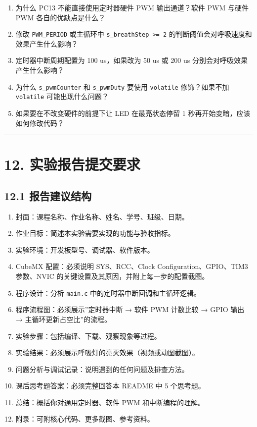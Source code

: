 \documentclass[
  chinese,
  UTF8,
  oneside,
  openany]{ctexbook}
\providecommand{\tightlist}{%
  \setlength{\itemsep}{0pt}\setlength{\parskip}{0pt}}
\begin{document}
\begin{enumerate}
\def\labelenumi{\arabic{enumi}.}
\tightlist
\item
  为什么 PC13 不能直接使用定时器硬件 PWM 输出通道？软件 PWM 与硬件 PWM
  各自的优缺点是什么？
\item
  修改 \texttt{PWM\_PERIOD} 或主循环中
  \texttt{s\_breathStep\ \textgreater{}=\ 2}
  的判断阈值会对呼吸速度和效果产生什么影响？
\item
  定时器中断周期配置为 100 us，如果改为 50 us 或 200 us
  分别会对呼吸效果产生什么影响？
\item
  为什么 \texttt{s\_pwmCounter} 和 \texttt{s\_pwmDuty} 要使用
  \texttt{volatile} 修饰？如果不加 \texttt{volatile} 可能出现什么问题？
\item
  如果要在不改变硬件的前提下让 LED 在最亮状态停留 1
  秒再开始变暗，应该如何修改代码？
\end{enumerate}

\begin{center}\rule{0.5\linewidth}{0.5pt}\end{center}

\section{12.
实验报告提交要求}\label{ux5b9eux9a8cux62a5ux544aux63d0ux4ea4ux8981ux6c42-3}

\subsection{12.1
报告建议结构}\label{ux62a5ux544aux5efaux8baeux7ed3ux6784-6}

\begin{enumerate}
\def\labelenumi{\arabic{enumi}.}
\tightlist
\item
  封面：课程名称、作业名称、姓名、学号、班级、日期。
\item
  作业目标：简述本实验需要实现的功能与验收指标。
\item
  实验环境：开发板型号、调试器、软件版本。
\item
  CubeMX 配置：必须说明 SYS、RCC、Clock Configuration、GPIO、TIM3
  参数、NVIC 的关键设置及其原因，并附上每一步的配置截图。
\item
  程序设计：分析 \texttt{main.c} 中的定时器中断回调和主循环逻辑。
\item
  程序流程图：必须展示''定时器中断 → 软件 PWM 计数比较 → GPIO 输出 →
  主循环更新占空比''的流程。
\item
  实验步骤：包括编译、下载、观察现象等过程。
\item
  实验结果：必须展示呼吸灯的亮灭效果（视频或动图截图）。
\item
  问题分析与调试记录：说明遇到的任何问题及排查方法。
\item
  课后思考题答案：必须完整回答本 README 中 5 个思考题。
\item
  总结：概括你对通用定时器、软件 PWM 和中断编程的理解。
\item
  附录：可附核心代码、更多截图、参考资料。
\end{enumerate}
\end{document}
